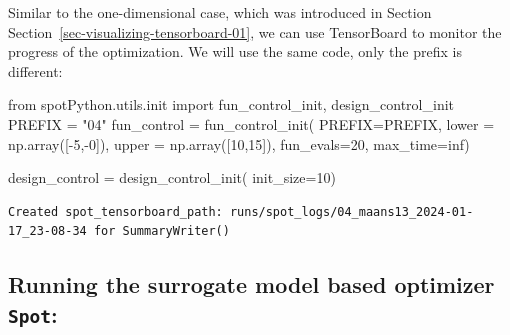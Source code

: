 \documentclass[
  letterpaper,
  DIV=11,
  numbers=noendperiod]{scrreprt}
\newenvironment{Shaded}{\begin{snugshade}}{\end{snugshade}}
\newcommand{\DecValTok}[1]{\textcolor[rgb]{0.68,0.00,0.00}{#1}}
\newcommand{\ImportTok}[1]{\textcolor[rgb]{0.00,0.46,0.62}{#1}}
\newcommand{\NormalTok}[1]{\textcolor[rgb]{0.00,0.23,0.31}{#1}}
\newcommand{\OperatorTok}[1]{\textcolor[rgb]{0.37,0.37,0.37}{#1}}
\newcommand{\StringTok}[1]{\textcolor[rgb]{0.13,0.47,0.30}{#1}}
\begin{document}
\begin{tcolorbox}[enhanced jigsaw, coltitle=black, bottomrule=.15mm, breakable, toprule=.15mm, colframe=quarto-callout-note-color-frame, title=\textcolor{quarto-callout-note-color}{\faInfo}\hspace{0.5em}{TensorBoard}, colbacktitle=quarto-callout-note-color!10!white, opacityback=0, left=2mm, leftrule=.75mm, colback=white, rightrule=.15mm, bottomtitle=1mm, toptitle=1mm, titlerule=0mm, arc=.35mm, opacitybacktitle=0.6]

Similar to the one-dimensional case, which was introduced in Section
Section~\ref{sec-visualizing-tensorboard-01}, we can use TensorBoard to
monitor the progress of the optimization. We will use the same code,
only the prefix is different:

\begin{Shaded}
\begin{Highlighting}[]
\ImportTok{from}\NormalTok{ spotPython.utils.init }\ImportTok{import}\NormalTok{ fun\_control\_init, design\_control\_init}
\NormalTok{PREFIX }\OperatorTok{=} \StringTok{"04"}
\NormalTok{fun\_control }\OperatorTok{=}\NormalTok{ fun\_control\_init(}
\NormalTok{    PREFIX}\OperatorTok{=}\NormalTok{PREFIX,}
\NormalTok{    lower }\OperatorTok{=}\NormalTok{ np.array([}\OperatorTok{{-}}\DecValTok{5}\NormalTok{,}\OperatorTok{{-}}\DecValTok{0}\NormalTok{]),}
\NormalTok{    upper }\OperatorTok{=}\NormalTok{ np.array([}\DecValTok{10}\NormalTok{,}\DecValTok{15}\NormalTok{]),}
\NormalTok{    fun\_evals}\OperatorTok{=}\DecValTok{20}\NormalTok{,}
\NormalTok{    max\_time}\OperatorTok{=}\NormalTok{inf)}

\NormalTok{design\_control }\OperatorTok{=}\NormalTok{ design\_control\_init(}
\NormalTok{    init\_size}\OperatorTok{=}\DecValTok{10}\NormalTok{)}
\end{Highlighting}
\end{Shaded}

\begin{verbatim}
Created spot_tensorboard_path: runs/spot_logs/04_maans13_2024-01-17_23-08-34 for SummaryWriter()
\end{verbatim}

\end{tcolorbox}

\subsection{\texorpdfstring{Running the surrogate model based optimizer
\texttt{Spot}:}{Running the surrogate model based optimizer Spot:}}\label{running-the-surrogate-model-based-optimizer-spot}
\end{document}
